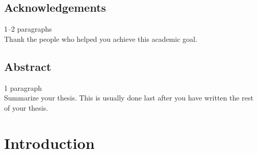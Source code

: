 \documentclass[a4paper]{book}
\begin{document}
\clearpage
\section*{Acknowledgements}
1--2 paragraphs \\

Thank the people who helped you achieve this academic goal.


\clearpage
\section*{Abstract}
1 paragraph \\

Summarize your thesis. This is usually done last after you have written the rest
of your thesis.


\tableofcontents           %
\listoffigures             %
\listoftables              %

\clearpage


\chapter{Introduction}
\end{document}
